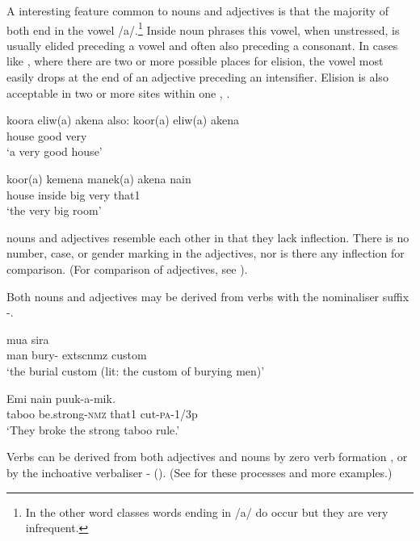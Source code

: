 A  interesting feature common to nouns and adjectives is that the majority of both end in the vowel /a/.\footnote{In the other word classes words ending in /a/ do occur but they are very infrequent.} Inside noun phrases this vowel, when unstressed, is usually elided preceding a vowel and often also preceding a consonant. In cases like , where there are two or more possible places for elision, the vowel most easily drops at the end of an adjective preceding an intensifier. Elision is also acceptable in two or more sites within one  , . 

\ea%
\label{ex:3:x3}
\gll koora eliw(a) akena  {\upshape also:} koor(a) eliw(a) akena \\
house good very\\
\glt`a very good house'
\z

\ea%
\label{ex:3:x4}
\gll koor(a) kemena manek(a) akena nain \\
house inside big very that1\\
\glt`the very big room'
\z

 nouns and adjectives resemble each other in that they lack inflection. There is no number, case, or gender marking in the adjectives, nor is there any inflection for comparison. (For comparison of adjectives, see ). 

Both nouns  and adjectives  may be derived from verbs with the nominaliser suffix \nobreakdash-.

\ea%
\label{ex:3:x7}
\gll mua  sira \\
man bury-	extsc{nmz} custom\\
\glt`the burial custom (lit: the custom of burying men)'
\z

\ea%
\label{ex:3:x8}
\gll Emi  nain puuk-a-mik. \\
taboo be.strong-\textsc{nmz} that1 cut-\textsc{pa}-1/3p\\
\glt`They broke the strong taboo rule.'
\z

Verbs can be derived from both adjectives and nouns by zero verb formation ,  or by the inchoative verbaliser \nobreakdash- (). (See  for these processes and more examples.)

